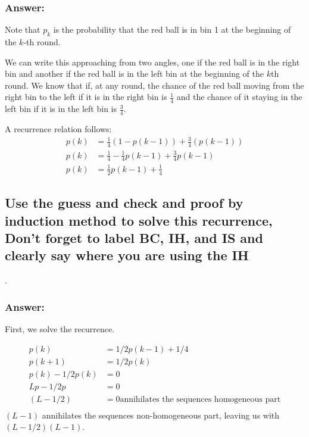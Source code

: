 \documentclass[titlepage]{article}
\theoremstyle{definition}
\begin{document}
  \subsubsection{Answer:}
    Note that $p_k$ is the probability that the red ball is in bin 1 at the beginning of
    the $k$-th round.

    We can write this approaching from two angles, one if the red ball is in the
    right bin and another if the red ball is in the left bin at the beginning of
    the $k$th round. 
    We know that if, at any round, the chance of the red ball moving from the right
    bin to the left if it is in the right bin is $\frac{1}{4}$ and the chance of it
    staying in the left bin if it is in the left bin is $\frac{3}{4}$. 

    A recurrence relation follows:
    \begin{align*}
      p(k) & = \frac{1}{4}\left(1 - p(k-1)\right) + \frac{3}{4}\left(p\left(k-1\right)\right) \\
      p(k) & = \frac{1}{4} - \frac{1}{4}p(k-1) + \frac{3}{4}p(k-1) \\
      p(k) & = \frac{1}{2}p(k-1) + \frac{1}{4} 
    \end{align*}


  \subsection{Use the guess and check and proof by induction method to solve this
          recurrence, Don't forget to label BC, IH, and IS and clearly say where you
          are using the IH}.
  \subsubsection{Answer:}
    First, we solve the recurrence.

    \begin{align*}
      p(k) & = 1/2 p(k -1) + 1/4 \\
      p(k+1) & = 1/2 p(k) \\
      p(k) - 1/2 p(k) & =  0  \\
      Lp - 1/2 p & = 0 \\
      \left( L - 1/2 \right) & = 0 \text{annihilates the sequences homogeneous part} \\
    \end{align*}
      $ \left(L - 1\right) $ annihilates the sequences non-homogeneous part,
    leaving us with $\left( L - 1/2 \right) \left(L - 1\right)$. 
\end{document}
